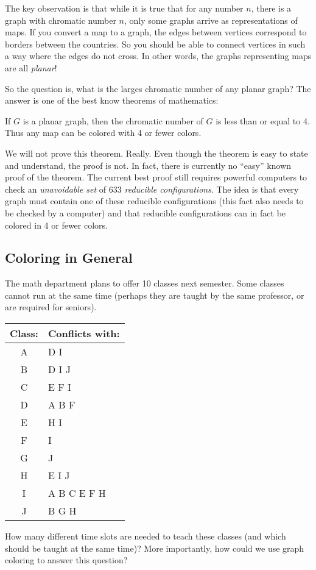 \documentclass[12pt]{article}
\begin{document}
The key observation is that while it is true that for any number $n$, there is a graph with chromatic number $n$, only some graphs arrive as representations of maps.  If you convert a map to a graph, the edges between vertices correspond to borders between the countries.  So you should be able to connect vertices in such a way where the edges do not cross.  In other words, the graphs representing maps are all {\em planar}!

So the question is, what is the larges chromatic number of any planar graph?  The answer is one of the best know theorems of mathematics:

\begin{theorem}
If $G$ is a planar graph, then the chromatic number of $G$ is less than or equal to 4.  Thus any map can be colored with 4 or fewer colors.
\end{theorem}

We will not prove this theorem.  Really.  Even though the theorem is easy to state and understand, the proof is not.  In fact, there is currently no ``easy'' known proof of the theorem.  The current best proof still requires powerful computers to check an {\em unavoidable set} of  633 {\em reducible configurations}.  The idea is that every graph must contain one of these reducible configurations (this fact also needs to be checked by a computer) and that reducible configurations can in fact be colored in 4 or fewer colors. 


\subsection{Coloring in General}
\begin{activity}
The math department plans to offer 10 classes next semester.  Some classes cannot run at the same time (perhaps they are taught by the same professor, or are required for seniors).  

\begin{center}
\begin{tabular}{cl}
\textbf{Class:} & \textbf{Conflicts with:} \\ \hline
A & D I \\
B & D I J \\
C & E F I \\
D & A B F \\
E & H I\\
F & I\\
G & J \\
H & E I J\\
I & A B C E F H \\
J & B G H
\end{tabular}
\end{center}

How many different time slots are needed to teach these classes (and which should be taught at the same time)?  More importantly, how could we use graph coloring to answer this question?
\end{activity}
\end{document}
